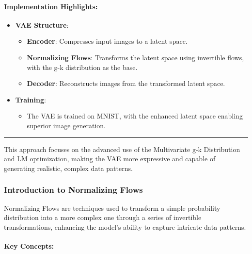 \documentclass[11pt]{article}
\providecommand{\tightlist}{%
      \setlength{\itemsep}{0pt}\setlength{\parskip}{0pt}}
\begin{document}
\paragraph{Implementation Highlights:}\label{implementation-highlights}

\begin{itemize}
\tightlist
\item
  \textbf{VAE Structure}:

  \begin{itemize}
  \tightlist
  \item
    \textbf{Encoder}: Compresses input images to a latent space.
  \item
    \textbf{Normalizing Flows}: Transforms the latent space using
    invertible flows, with the g-k distribution as the base.
  \item
    \textbf{Decoder}: Reconstructs images from the transformed latent
    space.
  \end{itemize}
\item
  \textbf{Training}:

  \begin{itemize}
  \tightlist
  \item
    The VAE is trained on MNIST, with the enhanced latent space enabling
    superior image generation.
  \end{itemize}
\end{itemize}

\begin{center}\rule{0.5\linewidth}{0.5pt}\end{center}

This approach focuses on the advanced use of the Multivariate g-k
Distribution and LM optimization, making the VAE more expressive and
capable of generating realistic, complex data patterns.

    \subsubsection{Introduction to Normalizing
Flows}\label{introduction-to-normalizing-flows}

Normalizing Flows are techniques used to transform a simple probability
distribution into a more complex one through a series of invertible
transformations, enhancing the model's ability to capture intricate data
patterns.

\paragraph{Key Concepts:}\label{key-concepts}
\end{document}

